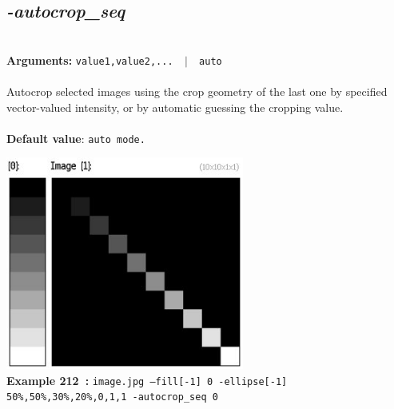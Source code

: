 \documentclass[a4paper,11pt,twoside]{book}
\begin{document}
\subsection{\emph{-autocrop\_seq} }\vspace*{-0.5em}
~\\\textbf{Arguments: } 
{\small \texttt{value1,value2,... ~$|$~ auto}}\\~\\
Autocrop selected images using the crop geometry of the last one by specified vector-valued intensity,
or by automatic guessing the cropping value.
~\\~\\\textbf{Default value}: {\small \texttt{auto mode.}}
\begin{center}\includegraphics[keepaspectratio=true,height=7cm,width=\textwidth]{img/gmic_def212.jpg}\\
{\footnotesize \textbf{Example 212~:} \texttt{image.jpg --fill[-1] 0 -ellipse[-1] 50\%,50\%,30\%,20\%,0,1,1 -autocrop\_seq 0}}
\end{center}
\end{document}
